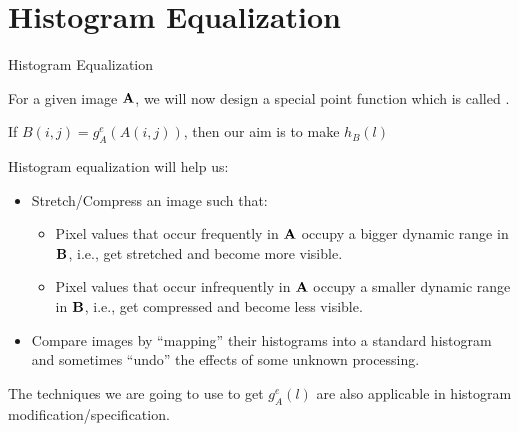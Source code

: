 %
%
\section{Histogram Equalization}
%
%
\begin{slide}{Histogram Equalization}
\begin{titlelist}{}{}
\small
\item<2-> For a given image ${\bf A}$, we will now
design a special point function  which
is called .

\item<3-> If $B(i,j)=g_A^e(A(i,j))$, then our aim is to make
$h_B(l)$ 

\item<4-> Histogram equalization will help us:
\begin{itemize}\scriptsize
\item<5-> Stretch/Compress an image such that:
	\begin{itemize}\scriptsize
	\item Pixel values that occur frequently in ${\bf A}$ occupy
	a bigger dynamic range in ${\bf B}$, i.e., get stretched and become more
	visible.
	\item Pixel values that occur infrequently in ${\bf A}$ occupy
	a smaller dynamic range in ${\bf B}$, i.e., get compressed and become less
	visible.
	\end{itemize}
\item<6-> Compare images by ``mapping'' their histograms into a standard
histogram and sometimes ``undo'' the effects of some unknown processing.
\end{itemize}

\item<7-> The techniques we are going to use to get $g_A^e(l)$
are also applicable in histogram modification/specification.

\end{titlelist}
\end{slide}


